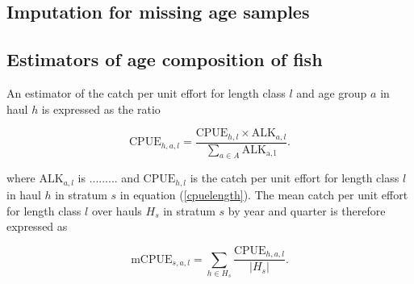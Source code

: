 \documentclass[a4paper 12pt]{article}
\numberwithin{equation}{section}
\begin{document}
%
%
%

\subsection{Imputation for missing age samples}



\subsection{Estimators of age composition of fish}
\label{agecom}

An estimator of the catch per unit effort for length class $l$ and age group $a$ in haul $h$ is expressed as the ratio

\begin{equation}
\mathrm{CPUE}_{h,a,l} =  \displaystyle \frac{\mathrm{CPUE}_{h,l} \times \mathrm{ALK}_{a,l}}{\displaystyle \sum\limits_{a \in A} \mathrm{ALK_{a,l}}}.
\label{cpueage}
\end{equation}

\noindent where $\mathrm{ALK}_{a,l} $ is ......... and $\mathrm{CPUE}_{h,l} $ is the catch per unit effort for length class $l$ in haul $h$ in stratum $s$ in equation (\ref{cpuelength}). The mean catch per unit effort for length class $l$ over hauls $H_{s}$ in stratum $s$ by year and quarter is therefore expressed as 

 \begin{equation}
\mathrm{mCPUE}_{s,a,l} = \sum\limits_{h \in H_{s}} \frac{\mathrm{CPUE}_{h,a,l}}{|H_{s}|}.
\label{mcpueage}
\end{equation} 
\end{document}
